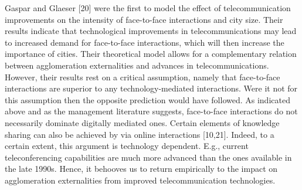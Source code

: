 \documentclass[10pt,letterpaper]{article}
\begin{document}
Gaspar and Glaeser {[}20{]} were the first to model the effect of
telecommunication improvements on the intensity of face-to-face
interactions and city size. Their results indicate that technological
improvements in telecommunications may lead to increased demand for
face-to-face interactions, which will then increase the importance of
cities. Their theoretical model allows for a complementary relation
between agglomeration externalities and advances in telecommunications.
However, their results rest on a critical assumption, namely that
face-to-face interactions are superior to any technology-mediated
interactions. Were it not for this assumption then the opposite
prediction would have followed. As indicated above and as the management
literature suggests, face-to-face interactions do not necessarily
dominate digitally mediated ones. Certain elements of knowledge sharing
can also be achieved by via online interactions {[}10,21{]}. Indeed, to
a certain extent, this argument is technology dependent. E.g., current
teleconferencing capabilities are much more advanced than the ones
available in the late 1990s. Hence, it behooves us to return empirically
to the impact on agglomeration externalities from improved
telecommunication technologies.

\color{blue}
\end{document}
